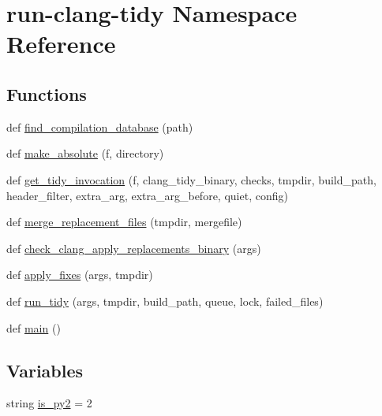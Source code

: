 \hypertarget{namespacerun-clang-tidy}{}\section{run-\/clang-\/tidy Namespace Reference}
\label{namespacerun-clang-tidy}
\subsection*{Functions}
\begin{DoxyCompactItemize}
\item 
def \hyperlink{namespacerun-clang-tidy_a6ac4a700cc424f234d870957b05abb6e}{find\+\_\+compilation\+\_\+database} (path)
\item 
def \hyperlink{namespacerun-clang-tidy_a0cea255a2d9edf0a7f877bd9bdd4c75f}{make\+\_\+absolute} (f, directory)
\item 
def \hyperlink{namespacerun-clang-tidy_a3cbee7957a6ad49d8a88b9c9d74a53dc}{get\+\_\+tidy\+\_\+invocation} (f, clang\+\_\+tidy\+\_\+binary, checks, tmpdir, build\+\_\+path, header\+\_\+filter, extra\+\_\+arg, extra\+\_\+arg\+\_\+before, quiet, config)
\item 
def \hyperlink{namespacerun-clang-tidy_ad3aaf1ecd87ad237a6e5caeeaa4a6ad6}{merge\+\_\+replacement\+\_\+files} (tmpdir, mergefile)
\item 
def \hyperlink{namespacerun-clang-tidy_ac9da9a27018bf1740f1f26c5f7657b7a}{check\+\_\+clang\+\_\+apply\+\_\+replacements\+\_\+binary} (args)
\item 
def \hyperlink{namespacerun-clang-tidy_aae1fd407c48d69133cc1122940aa86ac}{apply\+\_\+fixes} (args, tmpdir)
\item 
def \hyperlink{namespacerun-clang-tidy_a586db901d7ae78f0db162034b23cf68e}{run\+\_\+tidy} (args, tmpdir, build\+\_\+path, queue, lock, failed\+\_\+files)
\item 
def \hyperlink{namespacerun-clang-tidy_a3a4dae083818b9d5c9104e0142e03e3b}{main} ()
\end{DoxyCompactItemize}
\subsection*{Variables}
\begin{DoxyCompactItemize}
\item 
string \hyperlink{namespacerun-clang-tidy_aa041a8caae6885ce927c63a08f77dd83}{is\+\_\+py2} = \textquotesingle{}2\textquotesingle{}
\end{DoxyCompactItemize}


